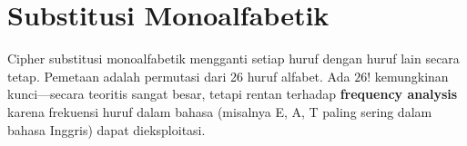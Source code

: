 \section{Substitusi Monoalfabetik}

Cipher substitusi monoalfabetik mengganti setiap huruf dengan huruf lain secara tetap. Pemetaan adalah permutasi dari 26 huruf alfabet. Ada $26!$ kemungkinan kunci---secara teoritis sangat besar, tetapi rentan terhadap \textbf{frequency analysis} karena frekuensi huruf dalam bahasa (misalnya E, A, T paling sering dalam bahasa Inggris) dapat dieksploitasi.
